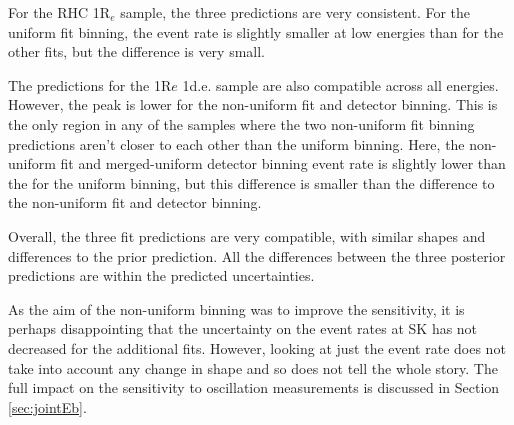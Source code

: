 For the RHC 1R$_e$ sample, the three predictions are very consistent. For the uniform fit binning, the event rate is slightly smaller at low energies than for the other fits, but the difference is very small.

The predictions for the 1R$e$ 1d.e. sample are also compatible across all energies. However, the peak is lower for the non-uniform fit and detector binning. This is the only region in any of the samples where the two non-uniform fit binning predictions aren't closer to each other than the uniform binning. Here, the non-uniform fit and merged-uniform detector binning event rate is slightly lower than the for the uniform binning, but this difference is smaller than the difference to the non-uniform fit and detector binning. 

Overall, the three fit predictions are very compatible, with similar shapes and differences to the prior prediction. All the differences between the three posterior predictions are within the predicted uncertainties.

As the aim of the non-uniform binning was to improve the sensitivity, it is perhaps disappointing that the uncertainty on the event rates at SK has not decreased for the additional fits. However, looking at just the event rate does not take into account any change in shape and so does not tell the whole story. The full impact on the sensitivity to oscillation measurements is discussed in Section \ref{sec:jointEb}.

